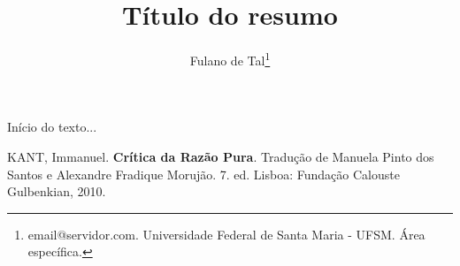 \documentclass[12pt,a4paper]{article}
\title{Título do resumo}
\author{Fulano de Tal\thanks{email@servidor.com. Universidade Federal de Santa Maria - UFSM. Área específica.}}
\begin{document}
\maketitle
{}
\singlespacing
 
Início do texto...
 
 
 
 
\begin{thebibliography}{BIBLIOGRAFIA}
 
 KANT, Immanuel. \textbf{Crítica da Razão Pura}. Tradução de Manuela Pinto dos Santos e Alexandre Fradique Morujão. 7. ed. Lisboa: Fundação Calouste Gulbenkian, 2010.
 
\end{thebibliography}
 
\end{document}
